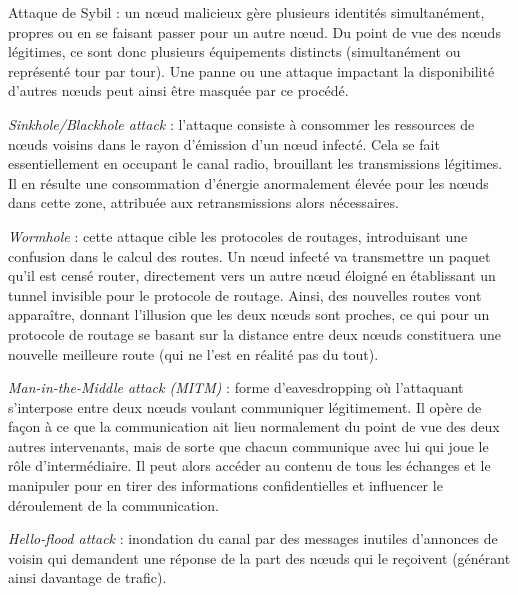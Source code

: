 \documentclass[]{article}
\begin{document}
\par Attaque de Sybil : un nœud malicieux gère plusieurs identités simultanément, propres ou en se faisant passer pour un autre nœud. Du point de vue des nœuds légitimes, ce sont donc plusieurs équipements distincts (simultanément ou représenté tour par tour). Une panne ou une attaque impactant la disponibilité d'autres nœuds peut ainsi être masquée par ce procédé.\\

\newpage

\par \textit{Sinkhole/Blackhole attack} : l'attaque consiste à consommer les ressources de nœuds voisins dans le rayon d'émission d'un nœud infecté. Cela se fait essentiellement en occupant le canal radio, brouillant les transmissions légitimes. Il en résulte une consommation d'énergie anormalement élevée pour les nœuds dans cette zone, attribuée aux retransmissions alors nécessaires.\\

\par \textit{Wormhole} : cette attaque cible les protocoles de routages, introduisant une confusion dans le calcul des routes. Un nœud infecté va transmettre un paquet qu'il est censé router, directement vers un autre nœud éloigné en établissant un tunnel invisible pour le protocole de routage. Ainsi, des nouvelles routes vont apparaître, donnant l'illusion que les deux nœuds sont proches, ce qui pour un protocole de routage se basant sur la distance entre deux nœuds constituera une nouvelle meilleure route (qui ne l'est en réalité pas du tout).\\

\par \textit{Man-in-the-Middle attack (MITM)} : forme d'eavesdropping où l'attaquant s'interpose entre deux nœuds voulant communiquer légitimement. Il opère de façon à ce que la communication ait lieu normalement du point de vue des deux autres intervenants, mais de sorte que chacun communique avec lui qui joue le rôle d'intermédiaire. Il peut alors accéder au contenu de tous les échanges et le manipuler pour en tirer des informations confidentielles et influencer le déroulement de la communication.\\

\par \textit{Hello-flood attack} : inondation du canal par des messages inutiles d'annonces de voisin qui demandent une réponse de la part des nœuds qui le reçoivent (générant ainsi davantage de trafic).\\
\end{document}
